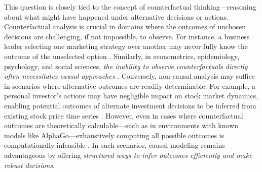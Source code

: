 

This question is closely tied to the concept of counterfactual thinking—reasoning about what might have happened under alternative decisions or actions. Counterfactual analysis is crucial in domains where the outcomes of unchosen decisions are challenging, if not impossible, to observe. For instance, a business leader selecting one marketing strategy over another may never fully know the outcome of the unselected option \citep{rubin1974estimating, pearl2009causal}. Similarly, in econometrics, epidemiology, psychology, and social sciences, \textit{the inability to observe counterfactuals directly often necessitates causal approaches} \citep{morgan2015counterfactuals, imbens2015causal}. 
Conversely, non-causal analysis may suffice in scenarios where alternative outcomes are readily determinable. For example, a personal investor's actions may have negligible impact on stock market dynamics, enabling potential outcomes of alternate investment decisions to be inferred from existing stock price time series \citep{angrist2008mostly}. However, even in cases where counterfactual outcomes are theoretically calculable—such as in environments with known models like AlphaGo—exhaustively computing all possible outcomes is computationally infeasible \citep{silver2017mastering, silver2018general}. 
In such scenarios, causal modeling remains advantageous by offering \textit{structured ways to infer outcomes efficiently and make robust decisions}. 





